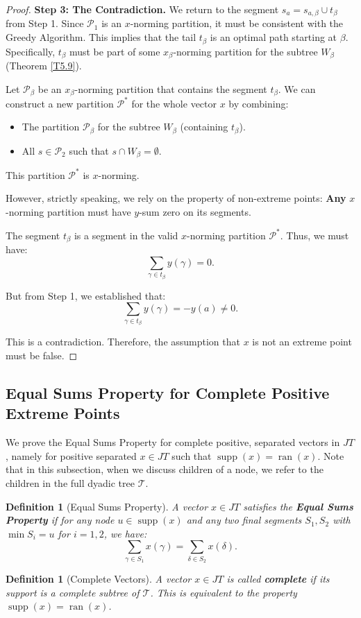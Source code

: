 \documentclass[11pt,a4paper]{amsart}
\newtheorem{definition}[theorem]{Definition}
\newcommand{\JT}{JT}
\newcommand{\Tree}{\mathcal{T}}
\newcommand{\supp}{\operatorname{supp}}
\newcommand{\ran}{\operatorname{ran}}
\begin{document}
\begin{proof}
    \textbf{Step 3: The Contradiction.}
    We return to the segment $s_a = s_{a, \beta} \cup t_\beta$ from Step 1.
    Since $\mathcal{P}_1$ is an $x$-norming partition, it must be consistent with the Greedy Algorithm. This implies that the tail $t_\beta$ is an optimal path starting at $\beta$. Specifically, $t_\beta$ must be part of some $x_\beta$-norming partition for the subtree $W_\beta$ (Theorem \ref{T5.9}).
    
    Let $\mathcal{P}_\beta$ be an $x_\beta$-norming partition that contains the segment $t_\beta$. We can construct a new partition $\mathcal{P}^*$ for the whole vector $x$ by combining:
    \begin{itemize}
        \item The partition $\mathcal{P}_\beta$ for the subtree $W_\beta$ (containing $t_\beta$).
        \item All $s \in \mathcal{P}_2$ such that $s \cap W_\beta = \emptyset$.
    \end{itemize}
    This partition $\mathcal{P}^*$ is $x$-norming.
    
    However, strictly speaking, we rely on the property of non-extreme points: \textbf{Any} $x$-norming partition must have $y$-sum zero on its segments.
    
    The segment $t_\beta$ is a segment in the valid $x$-norming partition $\mathcal{P}^*$.
    Thus, we must have:
    \[ \sum_{\gamma \in t_\beta} y(\gamma) = 0. \]
    
    But from Step 1, we established that:
    \[ \sum_{\gamma \in t_\beta} y(\gamma) = -y(a) \neq 0. \]
    
    This is a contradiction. Therefore, the assumption that $x$ is not an extreme point must be false.
\end{proof}

\subsection{Equal Sums Property for Complete Positive Extreme Points}

We prove the Equal Sums Property for complete positive, separated vectors in $\JT$, namely for positive separated $x\in \JT$ such that $\supp(x) = \ran(x)$. Note that in this subsection, when we discuss children of a node, we refer to the children in the full dyadic tree $\Tree$.

\begin{definition}[Equal Sums Property]
    A vector $x \in \JT$ satisfies the \textbf{Equal Sums Property} if for any node $u \in \supp(x)$ and any two final segments $S_1, S_2$ with $\min S_i = u$ for $i=1,2$, we have:
    \[ \sum_{\gamma \in S_1} x(\gamma) = \sum_{\delta \in S_2} x(\delta). \]
\end{definition}
\begin{definition}[Complete Vectors]
  A vector $x\in \JT$ is called \textbf{complete} if its support is a complete subtree of 
$\Tree$. This is equivalent to the property $\supp(x) = \ran(x)$.
\end{definition}
\end{document}
